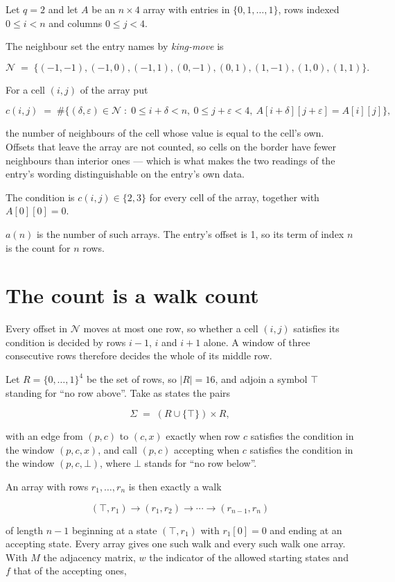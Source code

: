 \documentclass[11pt]{article}
\theoremstyle{definition}
\begin{document}
Let $q = 2$ and let $A$ be an $n \times 4$ array with entries in $\{0,1,\dots,1\}$, rows indexed $0 \le i < n$ and columns $0 \le j < 4$.

The neighbour set the entry names by {\itshape king-move} is

\[\mathcal{N} \;=\; \{(-1,-1), (-1,0), (-1,1), (0,-1), (0,1), (1,-1), (1,0), (1,1)\}.\]

For a cell $(i,j)$ of the array put

\[c(i,j) \;=\; \#\bigl\{(\delta,\varepsilon)\in\mathcal{N} \;:\; 0\le i+\delta<n,\ 0\le j+\varepsilon<4,\ A[i+\delta][j+\varepsilon] = A[i][j]\bigr\},\]

the number of neighbours of the cell whose value is equal to the cell's own. Offsets that leave the array are not counted, so cells on the border have fewer neighbours than interior ones --- which is what makes the two readings of the entry's wording distinguishable on the entry's own data.

The condition is $c(i,j) \in \{2, 3\}$ for every cell of the array, together with $A[0][0]=0$.

$a(n)$ is the number of such arrays. The entry's offset is 1, so its term of index $n$ is the count for $n$ rows.

\section{The count is a walk count}

Every offset in $\mathcal{N}$ moves at most one row, so whether a cell $(i,j)$ satisfies its condition is decided by rows $i-1$, $i$ and $i+1$ alone. A window of three consecutive rows therefore decides the whole of its middle row.

Let $R = \{0,\dots,1\}^{4}$ be the set of rows, so $|R| = 16$, and adjoin a symbol $\top$ standing for ``no row above''. Take as states the pairs

\[\Sigma \;=\; (R \cup \{\top\}) \times R,\]

with an edge from $(p,c)$ to $(c,x)$ exactly when row $c$ satisfies the condition in the window $(p,c,x)$, and call $(p,c)$ accepting when $c$ satisfies the condition in the window $(p,c,\bot)$, where $\bot$ stands for ``no row below''.

An array with rows $r_1,\dots,r_n$ is then exactly a walk

\[(\top,r_1) \to (r_1,r_2) \to \cdots \to (r_{n-1},r_n)\]

of length $n-1$ beginning at a state $(\top,r_1)$ with $r_1[0]=0$ and ending at an accepting state. Every array gives one such walk and every such walk one array. With $M$ the adjacency matrix, $w$ the indicator of the allowed starting states and $f$ that of the accepting ones,
\end{document}
